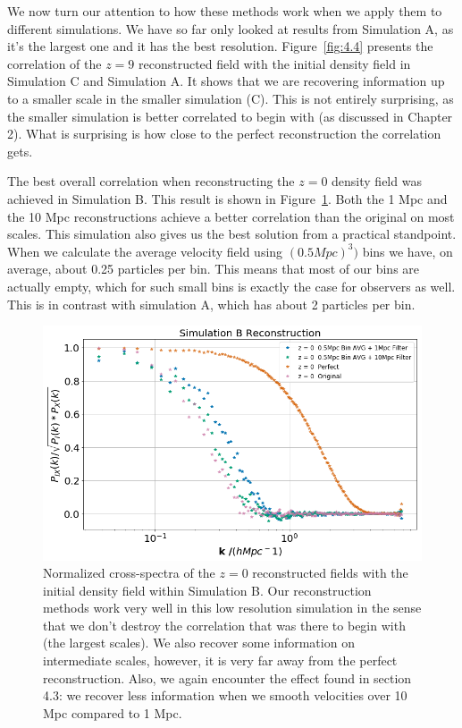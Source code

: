 We now turn our attention to how these methods work when we apply them to different simulations. We have so far only looked at results from Simulation A, as it's the largest one and it has the best resolution. Figure~\ref{fig:4.4} presents the correlation of the $z=9$ reconstructed field with the initial density field in Simulation C and Simulation A. It shows that we are recovering information up to a smaller scale in the smaller simulation (C). This is not entirely surprising, as the smaller simulation is better correlated to begin with (as discussed in Chapter 2). What is surprising is how close to the perfect reconstruction the correlation gets.

The best overall correlation when reconstructing the $z=0$ density field was achieved in Simulation B. This result is shown in Figure~\ref{fig:4.5}. Both the 1 Mpc and the 10 Mpc reconstructions achieve a better correlation than the original on most scales. This simulation also gives us the best solution from a practical standpoint. When we calculate the average velocity field using $(0.5 Mpc)^3)$ bins we have, on average, about 0.25 particles per bin. This means that most of our bins are actually empty, which for such small bins is exactly the case for observers as well. This is in contrast with simulation A, which has about 2 particles per bin.

\begin{figure}
    \centering
    \includegraphics[width=1\columnwidth]{images/realRecon/simBRecon.png}%
    
    \caption{
        Normalized cross-spectra of the $z=0$ reconstructed fields with the initial density field within Simulation B. Our reconstruction methods work very well in this low resolution simulation in the sense that we don't destroy the correlation that was there to begin with (the largest scales). We also recover some information on intermediate scales, however, it is very far away from the perfect reconstruction. Also, we again encounter the effect found in section 4.3: we recover less information when we smooth velocities over 10 Mpc compared to 1 Mpc. 
    }
    
    \label{fig:4.5}
\end{figure}

